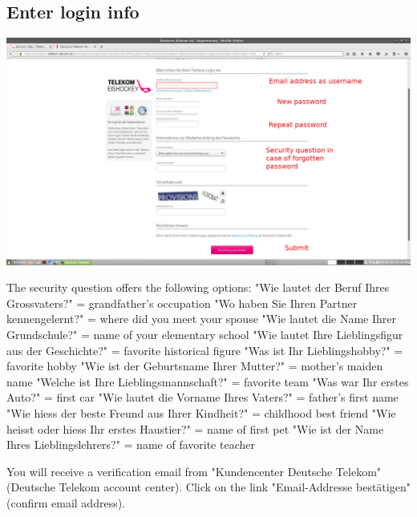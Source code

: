 \documentclass[12pt]{article}
\begin{document}
	\subsection{Enter login info}
		\includegraphics[width=\textwidth]{04-setup_login.png}
		\begin{flushleft}
		The security question offers the following options: \linebreak
		"Wie lautet der Beruf Ihres Grossvaters?" = grandfather's occupation \linebreak
		"Wo haben Sie Ihren Partner kennengelernt?" = where did you meet your spouse \linebreak
		"Wie lautet die Name Ihrer Grundschule?" = name of your elementary school \linebreak
		"Wie lautet Ihre Lieblingsfigur aus der Geschichte?" = favorite historical figure \linebreak
		"Was ist Ihr Lieblingshobby?" = favorite hobby \linebreak
		"Wie ist der Geburtsname Ihrer Mutter?" = mother's maiden name \linebreak
		"Welche ist Ihre Lieblingsmannschaft?" = favorite team \linebreak
		"Was war Ihr erstes Auto?" = first car \linebreak
		"Wie lautet die Vorname Ihres Vaters?" = father's first name \linebreak
		"Wie hiess der beste Freund aus Ihrer Kindheit?" = childhood best friend \linebreak
		"Wie heisst oder hiess Ihr erstes Haustier?" = name of first pet \linebreak
		"Wie ist der Name Ihres Lieblingslehrers?" = name of favorite teacher
		\end{flushleft}
		
		You will receive a verification email from "Kundencenter Deutsche Telekom" (Deutsche Telekom
		account center). Click on the link "Email-Addresse best{\"a}tigen" (confirm email address).
		
\end{document}
